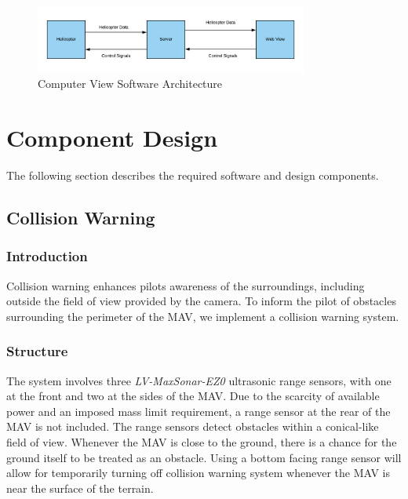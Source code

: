 \documentclass[onecolumn, oneside, letterpaper, draftclsnofoot, 10pt, compsoc]{IEEEtran}
\begin{document}
\begin{figure}[h]
    \centering
    \includegraphics[width=0.8\textwidth]{graphics/computer_diagram.png}
    \caption{Computer View Software Architecture}
    \label{fig:ComputerViewSoftwareArchitecture}
\end{figure}

\section{Component Design}
The following section describes the required software and design components.

\subsection{Collision Warning}
\subsubsection{Introduction}
Collision warning enhances pilot\textquotesingle s awareness of the surroundings, including outside the field of view provided by the camera. To inform the pilot of obstacles surrounding the perimeter of the MAV, we implement a collision warning system.

\subsubsection{Structure}
The system involves three \textit{LV-MaxSonar-EZ0} ultrasonic range sensors, with one at the front and two at the sides of the MAV. Due to the scarcity of available power and an imposed mass limit requirement, a range sensor at the rear of the MAV is not included. The range sensors detect obstacles within a conical-like field of view. Whenever the MAV is close to the ground, there is a chance for the ground itself to be treated as an obstacle. Using a bottom facing range sensor will allow for temporarily turning off collision warning system whenever the MAV is near the surface of the terrain.
\end{document}
